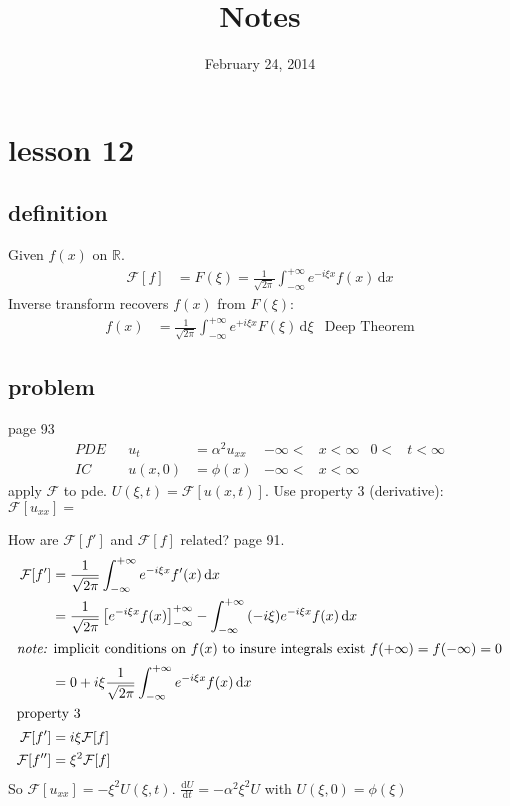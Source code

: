 \documentclass{article}
\begin{document}
\title{Notes}
\date{February 24, 2014}
\maketitle

\section*{lesson 12}
\subsection*{definition}
Given $f(x)$ on $\mathbb{R}$.
\begin{align*}
  \mathcal{F}[f]&=F(\xi)=\frac{1}{\sqrt{2\pi }}\int_{-\infty}^{+\infty}{e^{-i\xi x}f(x)\,\mathrm{d}x}
\end{align*}
Inverse transform recovers $f(x)$ from $F(\xi)$:
\begin{align*}
  f(x)&=\frac{1}{\sqrt{2\pi }}\int_{-\infty}^{+\infty}{e^{+i\xi x}F(\xi)\,\mathrm{d}\xi}&\text{Deep Theorem}
\end{align*}
\subsection*{problem}
page 93
\begin{align*}
  PDE&&u_t&=\alpha ^2u_{xx}&-\infty<&x<\infty&0<&t<\infty\\
  IC&&u(x,0)&=\phi(x)&-\infty<&x<\infty
\end{align*}
apply $\mathcal{F}$ to pde. $U(\xi,t)=\mathcal{F}[u(x,t)]$. Use property 3 (derivative): $\mathcal{F}[u_{xx}]=$

How are $\mathcal{F}[f']$ and $\mathcal{F}[f]$ related? page 91.
\begin{align*}
  \mathcal{F}[f']&=\frac{1}{\sqrt{2\pi }}\int_{-\infty}^{+\infty}{e^{-i\xi x}f'(x)\,\mathrm{d}x}\\
  &=\frac{1}{\sqrt{2\pi }}\left[e^{-i\xi x}f(x)\right]_{-\infty}^{+\infty}-\int_{-\infty}^{+\infty}{(-i\xi)e^{-i\xi x}f(x)\,\mathrm{d}x}\\
  \intertext{\emph{note:} implicit conditions on $f(x)$ to insure integrals exist $f(+\infty)=f(-\infty)=0$}
  &=0+i\xi\frac{1}{\sqrt{2\pi }}\int_{-\infty}^{+\infty}{e^{-i\xi x}f(x)\,\mathrm{d}x}\\
  \intertext{property 3}
  \mathcal{F}[f']&=i\xi\mathcal{F}[f]\\
  \mathcal{F}[f'']&=\xi^2\mathcal{F}[f]
\end{align*}
So $\mathcal{F}[u_{xx}]=-\xi^2U(\xi,t)$. $\frac{\mathrm{d}U}{\mathrm{d}t}=-\alpha ^2\xi^2U$ with $U(\xi,0)=\phi(\xi)$
\end{document}
